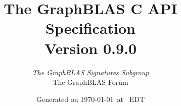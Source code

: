 \documentclass[11pt]{extbook}
\begin{document}
\linenumbers

\title{The GraphBLAS C API Specification\\ {\large Version 0.9.0}}
\author{\emph{\large The \emph{GraphBLAS} Signatures Subgroup}\\ The GraphBLAS Forum}
\date{Generated on \today\ at \currenttime\ EDT}

\renewcommand{\vector}[1]{{\bf #1}}
\renewcommand{\matrix}[1]{{\bf #1}}
\renewcommand{\arg}[1]{{\sf #1}}
\newcommand{\zip}{{\mbox{zip}}}
\newcommand{\zap}{{\mbox{zap}}}
\newcommand{\ewiseadd}{{\mbox{\bf ewiseadd}}}
\newcommand{\ewisemult}{{\mbox{\bf ewisemult}}}
\newcommand{\mxm}{{\mbox{\bf mxm}}}
\newcommand{\vxm}{{\mbox{\bf vxm}}}
\newcommand{\mxv}{{\mbox{\bf mxv}}}
\newcommand{\gpit}[1]{{\sf #1}}
\newcommand{\ie}{\emph{i.e.}}
\newcommand{\eg}{\emph{e.g.}}
\newcommand{\nan}{{\sf NaN}}
\newcommand{\nil}{{\bf nil}}
\newcommand{\ifif}{{\bf if}}
\newcommand{\ifthen}{{\bf then}}
\newcommand{\ifelse}{{\bf else}}
\newcommand{\ifendif}{{\bf endif}}
\newcommand{\zero}{{\bf 0}}
\newcommand{\one}{{\bf 1}}
\newcommand{\true}{{\sf true}}
\newcommand{\false}{{\sf false}}

\newcommand{\aydin}[1]{{{\color{orange}[Aydin: #1]}}}
\newcommand{\scott}[1]{{{\color{violet}[Scott: #1]}}}
\newcommand{\tim}[1]{{{\color{teal}[Tim: #1]}}}
\newcommand{\jose}[1]{{{\color{red}[Jose: #1]}}}
\newcommand{\carl}[1]{{{\color{blue}[Carl: #1]}}}
\newcommand{\ajy}[1]{{{\color{brown}[Yzelman: #1]}}}


\renewcommand{\comment}[1]{{}}
\newcommand{\glossBegin}{\begin{itemize}}
\newcommand{\glossItem}[1]{\item \emph{#1}: }
\newcommand{\glossEnd}{\end{itemize}}

\setlength{\parskip}{0.5\baselineskip}
\setlength{\parindent}{0ex}

\maketitle
\end{document}
